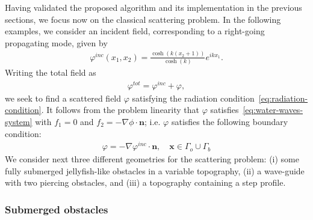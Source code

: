 \documentclass[review,hidelinks,onefignum,onetabnum]{siamart220329}
\newcommand{\bn}{\mathbf{n}}
\newcommand{\bx}{\mathbf{x}}
\begin{document}
Having validated the proposed algorithm and its implementation in the
previous sections, we focus now on the classical scattering problem. In the following examples, we consider an incident field, corresponding to a right-going propagating mode, given by 
\begin{align}
  \varphi^{inc}(x_1,x_2) = \frac{\cosh(k(x_2+1))}{\cosh(k)} e^{i k x_1}.
\end{align}
Writing the total field as
\begin{align}
  \varphi^{tot} = \varphi^{inc} + \varphi,
\end{align}
we seek to find a scattered field $\varphi$ satisfying the radiation condition~\cref{eq:radiation-condition}. It follows from the problem linearity that $\varphi$
satisfies~\cref{eq:water-waves-system} with $f_1 = 0$ and $f_2 = -\nabla \phi
\cdot \bn$; i.e. $\varphi$ satisfies the following boundary condition:
\begin{align}
  \varphi = - \nabla \varphi^{inc} \cdot \bn, \quad \bx \in \Gamma_o \cup \Gamma_b
\end{align}
We consider next three different geometries for the scattering problem: (i) some fully submerged jellyfish-like obstacles in a variable topography, (ii) a wave-guide with two piercing obstacles, and (iii) a topography containing a step profile. 

\subsubsection{Submerged obstacles}
\end{document}
